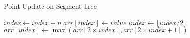 \begin{algorithm}
    \caption{Point Update on Segment Tree }
    \begin{algorithmic}
            \State $index \gets index + n$ 
            \State $arr[index] \gets value$ 
             
                \State $index \gets \lfloor index / 2 \rfloor$
                \State $arr[index] \gets \max(arr[2 \times index], arr[2 \times index + 1])$
            \EndWhile
        \EndProcedure
    \end{algorithmic}
\end{algorithm}